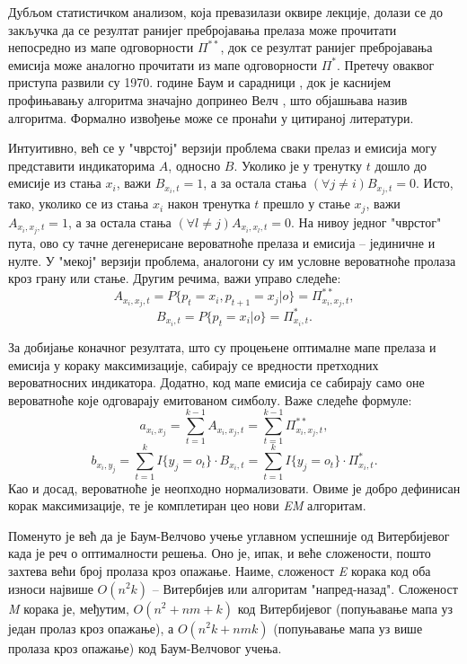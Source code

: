\documentclass[12pt,oneside]{memoir}
\begin{document}
\begin{CJK}{UTF8}{ipxm}
Дубљом статистичком анализом, која превазилази оквире лекције, долази се до закључка да се резултат ранијег пребројавања прелаза може прочитати непосредно из мапе одговорности $\Pi^{**}$, док се резултат ранијег пребројавања емисија може аналогно прочитати из мапе одговорности $\Pi^*$. Претечу оваквог приступа развили су 1970. године Баум и сарадници \cite{baum1970}, док је каснијем профињавању алгоритма значајно допринео Велч \cite{welch2003}, што објашњава назив алгоритма. Формално извођење може се пронаћи у цитираној литератури.

Интуитивно, већ се у "чврстој" верзији проблема сваки прелаз и емисија могу представити индикаторима $A$, односно $B$. Уколико је у тренутку $t$ дошло до емисије из стања $x_i$, важи $B_{x_i, t} = 1$, а за остала стања $(\forall j \ne i) B_{x_j, t} = 0$. Исто, тако, уколико се из стања $x_i$ након тренутка $t$ прешло у стање $x_j$, важи $A_{x_i, x_j, t} = 1$, а за остала стања $(\forall l \ne j) A_{x_i, x_l, t} = 0$. На нивоу једног "чврстог" пута, ово су тачне дегенерисане вероватноће прелаза и емисија -- јединичне и нулте. У "мекој" верзији проблема, аналогони су им условне вероватноће пролаза кроз грану или стање. Другим речима, важи управо следеће: $$A_{x_i, x_j, t} = P\{p_t = x_i, p_{t+1} = x_j | o\} = \Pi^{**}_{x_i, x_j, t},$$ $$B_{x_i, t} = P\{p_t = x_i | o\} = \Pi^*_{x_i, t}.$$

За добијање коначног резултата, што су процењене оптималне мапе прелаза и емисија у кораку максимизације, сабирају се вредности претходних вероватносних индикатора. Додатно, код мапе емисија се сабирају само оне вероватноће које одговарају емитованом симболу. Важе следеће формуле: $$a_{x_i, x_j} = \sum_{t=1}^{k-1} A_{x_i, x_j, t} = \sum_{t=1}^{k-1} \Pi^{**}_{x_i, x_j, t},$$ $$b_{x_i, y_j} = \sum_{t=1}^k I\{y_j = o_t\} \cdot B_{x_i, t} = \sum_{t=1}^k I\{y_j = o_t\} \cdot \Pi^*_{x_i, t}.$$ Као и досад, вероватноће је неопходно нормализовати. Овиме је добро дефинисан корак максимизације, те је комплетиран цео нови \textit{EM} алгоритам.

Поменуто је већ да је Баум-Велчово учење углавном успешније од Витербијевог када је реч о оптималности решења. Оно је, ипак, и веће сложености, пошто захтева већи број пролаза кроз опажање. Наиме, сложеност \textit{E} корака код оба износи највише $O(n^2 k)$ -- Витербијев или алгоритам "напред-назад". Сложеност \textit{M} корака је, међутим, $O(n^2 + nm + k)$ код Витербијевог (попуњавање мапа уз један пролаз кроз опажање), а $O(n^2 k + nmk)$ (попуњавање мапа уз више пролаза кроз опажање) код Баум-Велчовог учења.


\end{CJK}
\end{document}
